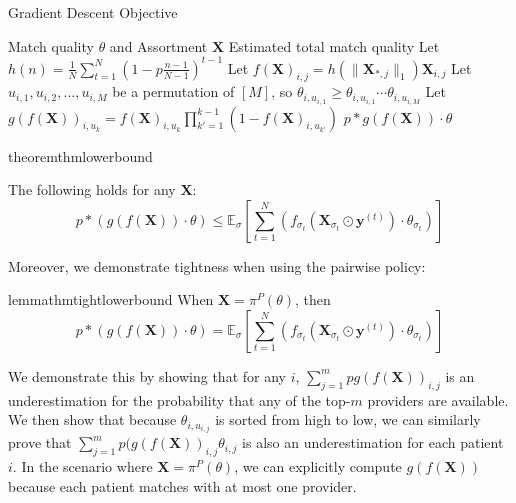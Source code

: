 \begin{algorithm}[h]
   \caption{Gradient Descent Objective}
\begin{algorithmic}
     Match quality $\theta$ and Assortment $\mathbf{X}$
     Estimated total match quality
    \STATE Let $h(n) = \frac{1}{N} \sum_{t=1}^{N} (1-p \frac{n-1}{N-1})^{t-1}$ 
    \STATE Let $f(\mathbf{X})_{i,j} = h(\lVert \mathbf{X}_{*,j} \rVert_{1}) \mathbf{X}_{i,j}$ 
    \STATE Let $u_{i,1},u_{i,2},\ldots,u_{i,M}$ be a permutation of $[M]$, so $\theta_{i,u_{i,1}} \geq \theta_{i,u_{i,1}} \cdots \theta_{i,u_{i,M}}$
    \STATE Let $g(f(\mathbf{X}))_{i,u_{k}} = f(\mathbf{X})_{i,u_{k}} \prod_{k'=1}^{k-1} (1-f(\mathbf{X})_{i,u_{k'}})$
    \RETURN $p*g(f(\mathbf{X})) \cdot \theta$
\end{algorithmic}
\label{alg:provider}
\end{algorithm}

\begin{restatable}{theorem}{thmlowerbound}
    
    The following holds for any $\mathbf{X}$:
    \begin{equation}
        p*(g(f(\mathbf{X})) \cdot \theta) \leq \mathbb{E}_{\sigma}[\sum_{t=1}^{N} (f_{\sigma_{t}}\left(\mathbf{X}_{\sigma_{t}} \odot \mathbf{y}^{(t)}\right)  \cdot \theta_{\sigma_{t}})]  
    \end{equation}
\end{restatable}

Moreover, we demonstrate tightness when using the pairwise policy: 
\begin{restatable}{lemma}{thmtightlowerbound}
    When $\mathbf{X} = \pi^{P}(\theta)$, then 
    \begin{equation}
        p*(g(f(\mathbf{X})) \cdot \theta) = \mathbb{E}_{\sigma}[\sum_{t=1}^{N} (f_{\sigma_{t}}\left(\mathbf{X}_{\sigma_{t}} \odot \mathbf{y}^{(t)}\right)  \cdot \theta_{\sigma_{t}})]  
    \end{equation}
\end{restatable}

We demonstrate this by showing that for any $i$, $\sum_{j=1}^{m} p g(f(\mathbf{X}))_{i,j}$ is an underestimation for the probability that any of the top-$m$ providers are available. 
We then show that because $\theta_{i,u_{i,j}}$ is sorted from high to low, we can similarly prove that $\sum_{j=1}^{m} p (g(f(\mathbf{X}))_{i,j} \theta_{i,j}$ is also an underestimation for each patient $i$. 
In the scenario where $\mathbf{X} = \pi^{P}(\theta)$, we can explicitly compute $g(f(\mathbf{X}))$ because each patient matches with at most one provider. 

